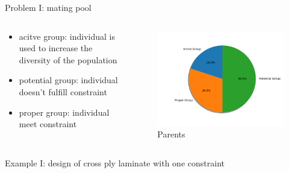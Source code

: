 \documentclass{beamer}
\begin{document}
\begin{frame}{Problem I: mating pool}
    \begin{columns}[c]
    \begin{column}{0.5\textwidth}
		\begin{itemize}
			\item acitve group: individual is used to increase the diversity of the population
			\item potential group: individual doesn't fulfill constraint
			\item proper group: individual meet constraint
		\end{itemize}
    \end{column}
	\begin{column}{0.5\textwidth}
		\begin{figure}
			\caption{Parents}
			\includegraphics[scale=0.5]{fig/chapter2_figure_group_pie.png}
		\end{figure}
	\end{column}
\end{columns}
\end{frame}

\begin{frame}{Example I: design of cross ply laminate with one constraint}
	
\end{frame}
\end{document}
